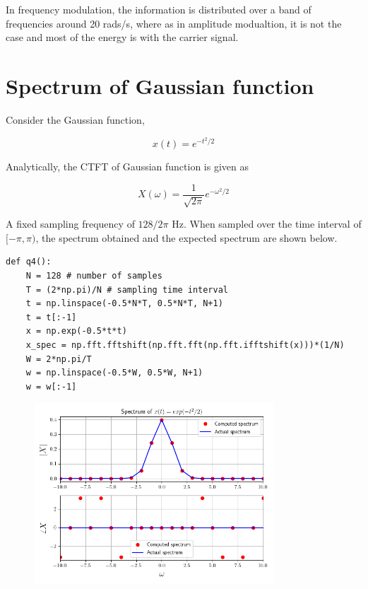 \documentclass[12pt, a4paper]{article}
\begin{document}
In frequency modulation, the information is distributed over a band of frequencies around 20 rads/s, where as in amplitude modualtion, it is not the case and most of the energy is with the carrier signal.

\section{Spectrum of Gaussian function}

Consider the Gaussian function,

\begin{equation*}
x(t) = e^{-t^2/2}
\end{equation*}

Analytically, the CTFT of Gaussian function is given as

\begin{equation*}
X(\omega) = \frac{1}{\sqrt{2\pi}}e^{-\omega^2/2}
\end{equation*}

A fixed sampling frequency of $128/2\pi$ Hz. When sampled over the time interval of $[-\pi, \pi)$, the spectrum obtained and the expected spectrum are shown below.

\begin{lstlisting}
def q4():
    N = 128 # number of samples
    T = (2*np.pi)/N # sampling time interval
    t = np.linspace(-0.5*N*T, 0.5*N*T, N+1)
    t = t[:-1]
    x = np.exp(-0.5*t*t)
    x_spec = np.fft.fftshift(np.fft.fft(np.fft.ifftshift(x)))*(1/N)
    W = 2*np.pi/T
    w = np.linspace(-0.5*W, 0.5*W, N+1)
    w = w[:-1]
\end{lstlisting}

\begin{figure}[H]
\centering
\includegraphics[width=0.8\textwidth]{q4_1.png}
\end{figure}
\end{document}
